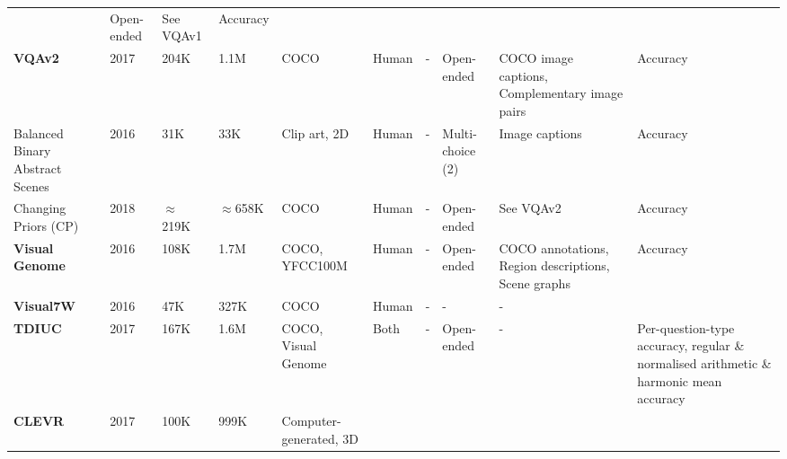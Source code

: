 \begin{landscape}
\begin{footnotesize}
\begin{center}
\begin{longtable}[c]{llllllllll}
          & Open-ended
          & See VQAv1
          & Accuracy\footnotemark[\value{footnote}] \\
          \textbf{VQAv2} \cite{goyal2017making}
          & 2017
          & 204K  %
          & 1.1M  %
          & COCO
          & Human
          & -
          & Open-ended
          & COCO image captions, Complementary image pairs
          & Accuracy\footnotemark[\value{footnote}] \\
          Balanced Binary Abstract Scenes \cite{zhang2016yin}
          & 2016
          & 31K %
          & 33K %
          & Clip art, 2D
          & Human
          & -
          & Multi-choice (2)
          & Image captions
          & Accuracy\footnotemark[\value{footnote}] \\
          Changing Priors (CP) \cite{agrawal2018dont}
          & 2018
          & {\color{red}\(\approx\)219K}  %
          & {\color{red}\(\approx\)658K}  %
          & COCO
          & Human
          & -
          & Open-ended
          & See VQAv2
          & Accuracy\footnotemark[\value{footnote}] \\
          \textbf{Visual Genome} \cite{krishna2017visual}
          & 2016
          & 108K  %
          & 1.7M  %
          & COCO, YFCC100M \cite{thomee2016yfcc100m}
          & Human
          & -
          & Open-ended
          & COCO annotations, Region descriptions, Scene graphs
          & Accuracy \\
          \textbf{Visual7W} \cite{zhu2016visual7w}
          & 2016
          & 47K %
          & 327K %
          & COCO
          & Human
          & -
          & -
          & - \\
          \textbf{TDIUC} \cite{kafle2017analysis}
          & 2017
          & 167K %
          & 1.6M %
          & COCO, Visual Genome
          & Both
          & -
          & Open-ended
          & -
          & Per-question-type accuracy, regular \& normalised arithmetic \& harmonic mean accuracy\\
          \textbf{CLEVR} \cite{johnson2017clevr}
          & 2017
          & 100K  %
          & 999K  %
          & Computer-generated, 3D

\end{longtable}
\end{center}
\end{footnotesize}
\end{landscape}
